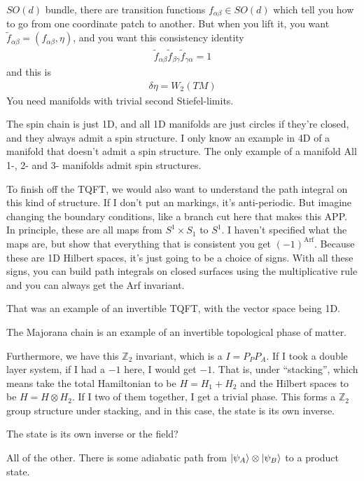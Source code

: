 $SO(d)$ bundle,
there are transition functions
$f_{\alpha\beta}\in SO(d)$
which tell you how to go from one coordinate patch to another.
But when you lift it,
you want
$\tilde{f}_{\alpha\beta} = (f_{\alpha\beta},\eta)$,
and you want this consistency identity
\begin{align}
    \tilde{f}_{\alpha\beta} \tilde{f}_{\beta\gamma} \tilde{f}_{\gamma\alpha}
    = 1
\end{align}
and this is 
\begin{align}
    \delta\eta = W_2(TM)
\end{align}
You need manifolds with trivial second Stiefel-limits.

The spin chain is just 1D,
and all 1D manifolds are just circles if they're closed,
and they always admit a spin structure.
I only know an example in 4D of a manifold that doesn't admit a spin structure.
The only example of a manifold
All 1-, 2- and 3- manifolds admit spin structures.

To finish off the TQFT,
we would also want to understand the path integral on this kind of structure.
If I don't put an markings,
it's anti-periodic.
But imagine changing the boundary conditions,
like a branch cut here that makes this APP.
In principle,
these are all maps from $S^1\times S_1$ to $S^1$.
I haven't specified what the maps are,
but show that everything that is consistent you get $(-1)^{\textrm{Arf}}$.
Because these are 1D Hilbert spaces,
it's just going to be a choice of signs.
With all these signs,
you can build path integrals on closed surfaces using the multiplicative rule
and you can always get the Arf invariant.

That was an example of an invertible TQFT,
with the vector space being 1D.

The Majorana chain is an example of an invertible topological phase of matter.

Furthermore,
we have this $\mathbb{Z}_2$ invariant,
which is a $I=P_P P_A$.
If I took a double layer system,
if I had a $-1$ here, I would get $-1$.
That is,
under ``stacking'',
which means take the total Hamiltonian to be $H=H_1+ H_2$
and the Hilbert spaces to be $H=H\otimes H_2$.
If I two of them together,
I get a trivial phase.
This forms a $\mathbb{Z}_2$ group structure under stacking,
and in this case,
the state is its own inverse.

\begin{question}
    The state is its own inverse or the field?
\end{question}
All of the other.
There is some adiabatic path from
$\ket{\psi_A}\otimes \ket{\psi_B}$
to a product state.

